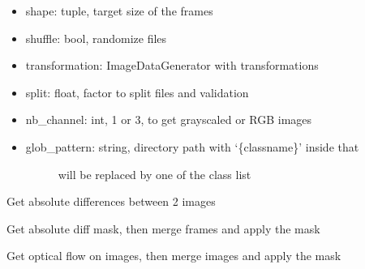 \documentclass[letterpaper,10pt,english]{sphinxmanual}
\begin{document}
\begin{fulllineitems}
\begin{itemize}
\item {} 
shape: tuple, target size of the frames

\item {} 
shuffle: bool, randomize files

\item {} 
transformation: ImageDataGenerator with transformations

\item {} 
split: float, factor to split files and validation

\item {} 
nb\_channel: int, 1 or 3, to get grayscaled or RGB images

\item {} \begin{description}
\item[{glob\_pattern: string, directory path with ‘\{classname\}’ inside that}] \leavevmode
will be replaced by one of the class list

\end{description}

\end{itemize}

\begin{fulllineitems}
\label{\detokenize{index:keras_video.flow.OpticalFlowGenerator.absdiff}}
Get absolute differences between 2 images

\end{fulllineitems}


\begin{fulllineitems}
\label{\detokenize{index:keras_video.flow.OpticalFlowGenerator.diff_mask}}
Get absolute diff mask, then merge frames and apply the mask

\end{fulllineitems}


\begin{fulllineitems}
\label{\detokenize{index:keras_video.flow.OpticalFlowGenerator.flow_mask}}
Get optical flow on images, then merge images and apply the mask


\end{fulllineitems}
\end{fulllineitems}
\end{document}

